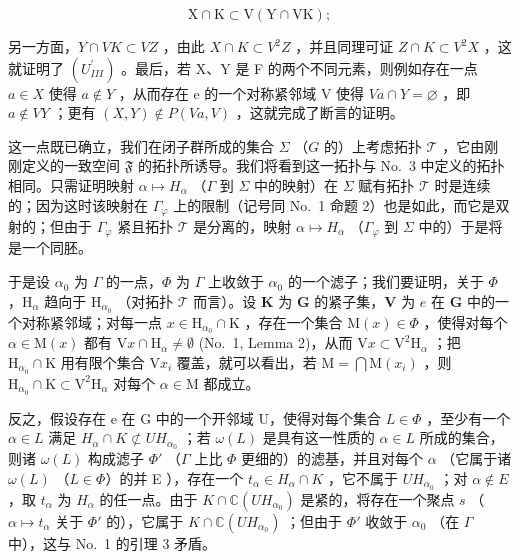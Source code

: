 \[
\mathrm{X} \cap \mathrm{K} \subset \mathrm{V} (\mathrm{Y} \cap \mathrm{VK});
\]

另一方面，\(Y \cap VK \subset VZ\) ，由此 \(X \cap K \subset V^{2}Z\) ，并且同理可证 \(Z \cap K \subset V^{2}X\) ，这就证明了 \((U_{III}^{\prime})\) 。最后，若 X、Y 是 F 的两个不同元素，则例如存在一点 \(a \in X\) 使得 \(a \notin Y\) ，从而存在 e 的一个对称紧邻域 V 使得 \(Va \cap Y = \varnothing\) ，即 \(a \notin VY\) ；更有 \((X,Y) \notin P(Va,V)\) ，这就完成了断言的证明。

这一点既已确立，我们在闭子群所成的集合 \(\Sigma\) （\(G\) 的）上考虑拓扑 \(\mathcal{T}\) ，它由刚刚定义的一致空间 \(\mathfrak{F}\) 的拓扑所诱导。我们将看到这一拓扑与 No.~3 中定义的拓扑相同。只需证明映射 \(\alpha \mapsto H_{\alpha}\) （\(\Gamma\) 到 \(\Sigma\) 中的映射）在 \(\Sigma\) 赋有拓扑 \(\mathcal{T}\) 时是连续的；因为这时该映射在 \(\Gamma_{\varphi}\) 上的限制（记号同 No.~1 命题 2）也是如此，而它是双射的；但由于 \(\Gamma_{\varphi}\) 紧且拓扑 \(\mathcal{T}\) 是分离的，映射 \(\alpha \mapsto H_{\alpha}\) （\(\Gamma_{\varphi}\) 到 \(\Sigma\) 中的）于是将是一个同胚。

于是设 \(\alpha_0\) 为 \(\Gamma\) 的一点，\(\Phi\) 为 \(\Gamma\) 上收敛于 \(\alpha_0\) 的一个滤子；我们要证明，关于 \(\Phi\) ，\(\mathrm{H}_{\alpha}\) 趋向于 \(\mathrm{H}_{\alpha_0}\) （对拓扑 \(\mathcal{T}\) 而言）。设 \(\mathbf{K}\) 为 \(\mathbf{G}\) 的紧子集，\(\mathbf{V}\) 为 \(e\) 在 \(\mathbf{G}\) 中的一个对称紧邻域；对每一点 \(x \in \mathrm{H}_{\alpha_0} \cap \mathrm{K}\) ，存在一个集合 \(\mathrm{M}(x) \in \Phi\) ，使得对每个 \(\alpha \in \mathrm{M}(x)\) 都有 \(\mathrm{V}x \cap \mathrm{H}_{\alpha} \neq \emptyset\) (No.~1, Lemma 2)，从而 \(\mathrm{V}x \subset \mathrm{V}^2\mathrm{H}_{\alpha}\) ；把 \(\mathrm{H}_{\alpha_0} \cap \mathrm{K}\) 用有限个集合 \(\mathrm{V}x_i\) 覆盖，就可以看出，若 \(\mathrm{M} = \bigcap \mathrm{M}(x_i)\) ，则 \(\mathrm{H}_{\alpha_0} \cap \mathrm{K} \subset \mathrm{V}^2\mathrm{H}_{\alpha}\) 对每个 \(\alpha \in \mathrm{M}\) 都成立。

反之，假设存在 e 在 G 中的一个开邻域 U，使得对每个集合 \(L \in \Phi\) ，至少有一个 \(\alpha \in L\) 满足 \(H_{\alpha} \cap K \not\subset UH_{\alpha_{0}}\) ；若 \(\omega(L)\) 是具有这一性质的 \(\alpha \in L\) 所成的集合，则诸 \(\omega(L)\) 构成滤子 \(\Phi'\) （\(\Gamma\) 上比 \(\Phi\) 更细的）的滤基，并且对每个 \(\alpha\) （它属于诸 \(\omega(L)\) （\(L \in \Phi\)）的并 E ），存在一个 \(t_{\alpha} \in H_{\alpha} \cap K\) ，它不属于 \(UH_{\alpha_0}\) ；对 \(\alpha \notin E\) ，取 \(t_{\alpha}\) 为 \(H_{\alpha}\) 的任一点。由于 \(K \cap \mathbb{C}(UH_{\alpha_0})\) 是紧的，将存在一个聚点 \(s\) （\(\alpha \mapsto t_{\alpha}\) 关于 \(\Phi'\) 的），它属于 \(K \cap \mathbb{C}(UH_{\alpha_0})\) ；但由于 \(\Phi'\) 收敛于 \(\alpha_0\) （在 \(\Gamma\) 中），这与 No.~1 的引理 3 矛盾。

